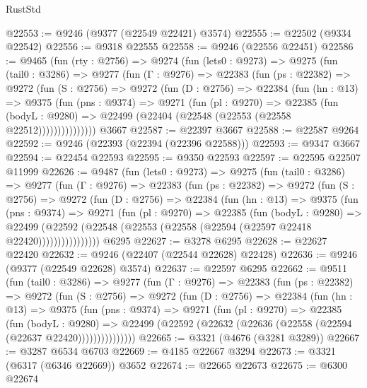 \begin{lexlean}{RustStd}
\begin{coremodule}
@22553 := @9246 (@9377 (@22549 @22421) @3574)
@22555 := @22502 (@9334 @22542)
@22556 := @9318 @22555
@22558 := @9246 (@22556 @22451)
@22586 := @9465
    (fun (rty : @2756) =>
    @9274
      (fun (lets0 : @9273) =>
      @9275
        (fun (tail0 : @3286) =>
        @9277
          (fun (Γ : @9276) =>
          @22383
            (fun (ps : @22382) =>
            @9272
              (fun (S : @2756) =>
              @9272
                (fun (D : @2756) =>
                @22384
                  (fun (hn : @13) =>
                  @9375
                    (fun (pns : @9374) =>
                    @9271
                      (fun (pl : @9270) =>
                      @22385
                        (fun (bodyL : @9280) =>
                        @22499 (@22404 (@22548 (@22553 (@22558 @22512)))))))))))))))
    @3667
@22587 := @22397 @3667
@22588 := @22587 @9264
@22592 := @9246 (@22393 (@22394 (@22396 @22588)))
@22593 := @9347 @3667
@22594 := @22454 @22593
@22595 := @9350 @22593
@22597 := @22595 @22507 @11999
@22626 := @9487
    (fun (lets0 : @9273) =>
    @9275
      (fun (tail0 : @3286) =>
      @9277
        (fun (Γ : @9276) =>
        @22383
          (fun (ps : @22382) =>
          @9272
            (fun (S : @2756) =>
            @9272
              (fun (D : @2756) =>
              @22384
                (fun (hn : @13) =>
                @9375
                  (fun (pns : @9374) =>
                  @9271
                    (fun (pl : @9270) =>
                    @22385
                      (fun (bodyL : @9280) =>
                      @22499
                        (@22592
                          (@22548 (@22553 (@22558 (@22594 (@22597 @22418 @22420))))))))))))))))
    @6295
@22627 := @3278 @6295
@22628 := @22627 @22420
@22632 := @9246 (@22407 (@22544 @22628) @22428)
@22636 := @9246 (@9377 (@22549 @22628) @3574)
@22637 := @22597 @6295
@22662 := @9511
    (fun (tail0 : @3286) =>
    @9277
      (fun (Γ : @9276) =>
      @22383
        (fun (ps : @22382) =>
        @9272
          (fun (S : @2756) =>
          @9272
            (fun (D : @2756) =>
            @22384
              (fun (hn : @13) =>
              @9375
                (fun (pns : @9374) =>
                @9271
                  (fun (pl : @9270) =>
                  @22385
                    (fun (bodyL : @9280) =>
                    @22499 (@22592 (@22632 (@22636 (@22558 (@22594 (@22637 @22420)))))))))))))))
@22665 := @3321 (@4676 (@3281 @3289))
@22667 := @3287 @6534 @6703
@22669 := @4185 @22667 @3294
@22673 := @3321 (@6317 (@6346 @22669)) @3652
@22674 := @22665 @22673
@22675 := @6300 @22674

\end{coremodule}
\end{lexlean}
